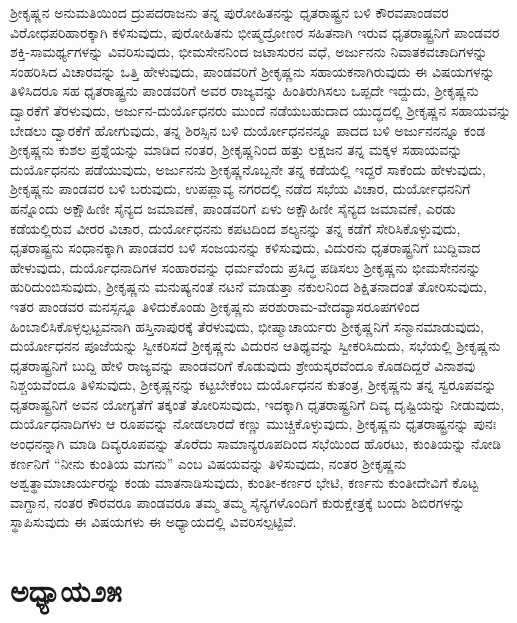 ಶ‍್ರೀಕೃಷ್ಣನ ಅನುಮತಿಯಿಂದ ದ್ರುಪದರಾಜನು ತನ್ನ ಪುರೋಹಿತನನ್ನು ಧೃತರಾಷ್ಟ್ರನ ಬಳಿ ಕೌರವಪಾಂಡವರ ವಿರೋಧಪರಿಹಾರಕ್ಕಾಗಿ ಕಳಿಸುವುದು, ಪುರೋಹಿತನು ಭೀಷ್ಮದ್ರೋಣರ ಸಹಿತನಾಗಿ ಇರುವ ಧೃತರಾಷ್ಟ್ರನಿಗೆ ಪಾಂಡವರ ಶಕ್ತಿ-ಸಾಮರ್ಥ್ಯಗಳನ್ನು ವಿವರಿಸುವುದು, ಭೀಮಸೇನನಿಂದ ಜಟಾಸುರನ ವಧೆ, ಅರ್ಜುನನು ನಿವಾತಕವಚಾದಿಗಳನ್ನು ಸಂಹರಿಸಿದ ವಿಚಾರವನ್ನು ಒತ್ತಿ ಹೇಳುವುದು, ಪಾಂಡವರಿಗೆ ಶ‍್ರೀಕೃಷ್ಣನು ಸಹಾಯಕನಾಗಿರುವುದು ಈ ವಿಷಯಗಳನ್ನು ತಿಳಿಸಿದರೂ ಸಹ ಧೃತರಾಷ್ಟ್ರನು ಪಾಂಡವರಿಗೆ ಅವರ ರಾಜ್ಯವನ್ನು ಹಿಂತಿರುಗಿಸಲು ಒಪ್ಪದೇ ಇದ್ದುದು, ಶ‍್ರೀಕೃಷ್ಣನು ದ್ವಾರಕೆಗೆ ತೆರಳುವುದು, ಅರ್ಜುನ-ದುರ್ಯೊಧನರು ಮುಂದೆ ನಡೆಯಬಹುದಾದ ಯುದ್ಧದಲ್ಲಿ ಶ‍್ರೀಕೃಷ್ಣನ ಸಹಾಯವನ್ನು ಬೇಡಲು ದ್ವಾರಕೆಗೆ ಹೋಗುವುದು, ತನ್ನ ಶಿರಸ್ಸಿನ ಬಳಿ ದುರ್ಯೋಧನನನ್ನೂ ಪಾದದ ಬಳಿ ಅರ್ಜುನನನ್ನೂ ಕಂಡ ಶ‍್ರೀಕೃಷ್ಣನು ಕುಶಲ ಪ್ರಶ್ನೆಯನ್ನು ಮಾಡಿದ ನಂತರ, ಶ‍್ರೀಕೃಷ್ಣನಿಂದ ಹತ್ತು ಲಕ್ಷಜನ ತನ್ನ ಮಕ್ಕಳ ಸಹಾಯವನ್ನು ದುರ್ಯೊಧನನು ಪಡೆಯುವುದು, ಅರ್ಜುನನು ಶ‍್ರೀಕೃಷ್ಣನೊಬ್ಬನೇ ತನ್ನ ಕಡೆಯಲ್ಲಿ ಇದ್ದರೆ ಸಾಕೆಂದು ಹೇಳುವುದು, ಶ‍್ರೀಕೃಷ್ಣನು ಪಾಂಡವರ ಬಳಿ ಬರುವುದು, ಉಪಪ್ಲಾವ್ಯ ನಗರದಲ್ಲಿ ನಡೆದ ಸಭೆಯ ವಿಚಾರ, ದುರ್ಯೋಧನನಿಗೆ ಹನ್ನೊಂದು ಅಕ್ಷೌಹಿಣೀ ಸೈನ್ಯದ ಜಮಾವಣೆ, ಪಾಂಡವರಿಗೆ ಏಳು ಅಕ್ಷೌಹಿಣೀ ಸೈನ್ಯದ ಜಮಾವಣೆ, ಎರಡು ಕಡೆಯಲ್ಲಿರುವ ವೀರರ ವಿಚಾರ, ದುರ್ಯೋಧನನು ಕಪಟದಿಂದ ಶಲ್ಯನನ್ನು ತನ್ನ ಕಡೆಗೆ ಸೇರಿಸಿಕೊಳ್ಳುವುದು, ಧೃತರಾಷ್ಟ್ರನು ಸಂಧಾನಕ್ಕಾಗಿ ಪಾಂಡವರ ಬಳಿ ಸಂಜಯನನ್ನು ಕಳಿಸುವುದು, ವಿದುರನು ಧೃತರಾಷ್ಟ್ರನಿಗೆ ಬುದ್ದಿವಾದ ಹೇಳುವುದು, ದುರ್ಯೊಧನಾದಿಗಳ ಸಂಹಾರವನ್ನು ಧರ್ಮವೆಂದು ಪ್ರಸಿದ್ಧ ಪಡಿಸಲು ಶ‍್ರೀಕೃಷ್ಣನು ಭೀಮಸೇನನನ್ನು ಹುರಿದುಂಬಿಸುವುದು, ಶ‍್ರೀಕೃಷ್ಣನು ಮನುಷ್ಯನಂತೆ ನಟನೆ ಮಾಡುತ್ತಾ ನಕುಲನಿಂದ ಶಿಕ್ಷಿತನಾದಂತೆ ತೋರಿಸುವುದು, ಇತರ ಪಾಂಡವರ ಮನಸ್ಸನ್ನೂ ತಿಳಿದುಕೊಂಡು ಶ‍್ರೀಕೃಷ್ಣನು ಪರಶುರಾಮ-ವೇದವ್ಯಾಸರೂಪಗಳಿಂದ ಹಿಂಬಾಲಿಸಿಕೊಳ್ಳಲ್ಪಟ್ಟವನಾಗಿ ಹಸ್ತಿನಾಪುರಕ್ಕೆ ತೆರಳುವುದು, ಭೀಷ್ಮಾಚಾರ್ಯರು ಶ‍್ರೀಕೃಷ್ಣನಿಗೆ ಸನ್ಮಾನಮಾಡುವುದು, ದುರ್ಯೋಧನನ ಪೂಜೆಯನ್ನು ಸ್ವೀಕರಿಸದೆ ಶ‍್ರೀಕೃಷ್ಣನು ವಿದುರನ ಆತಿಥ್ಯವನ್ನು ಸ್ವೀಕರಿಸಿದುದು, ಸಭೆಯಲ್ಲಿ ಶ‍್ರೀಕೃಷ್ಣನು ಧೃತರಾಷ್ಟ್ರನಿಗೆ ಬುದ್ದಿ ಹೇಳಿ ರಾಜ್ಯವನ್ನು ಪಾಂಡವರಿಗೆ ಕೊಡುವುದು ಶ್ರೇಯಸ್ಕರವೆಂದೂ ಕೊಡದಿದ್ದರೆ ವಿನಾಶವು ನಿಶ್ಚಯವೆಂದೂ ತಿಳಿಸುವುದು, ಶ‍್ರೀಕೃಷ್ಣನನ್ನು ಕಟ್ಟಬೇಕೆಂಬ ದುರ್ಯೊಧನನ ಕುತಂತ್ರ, ಶ‍್ರೀಕೃಷ್ಣನು ತನ್ನ ಸ್ವರೂಪವನ್ನು ಧೃತರಾಷ್ಟ್ರನಿಗೆ ಅವನ ಯೋಗ್ಯತೆಗೆ ತಕ್ಕಂತೆ ತೋರಿಸುವುದು, ಇದಕ್ಕಾಗಿ ಧೃತರಾಷ್ಟ್ರನಿಗೆ ದಿವ್ಯ ದೃಷ್ಟಿಯನ್ನು ನೀಡುವುದು, ದುರ್ಯೊಧನಾದಿಗಳು ಆ ರೂಪವನ್ನು ನೋಡಲಾರದೆ ಕಣ್ಣು ಮುಚ್ಚಿಕೊಳ್ಳುವುದು, ಶ‍್ರೀಕೃಷ್ಣನು ಧೃತರಾಷ್ಟ್ರನನ್ನು ಪುನಃ ಅಂಧನನ್ನಾಗಿ ಮಾಡಿ ದಿವ್ಯರೂಪವನ್ನು ತೊರೆದು ಸಾಮಾನ್ಯರೂಪದಿಂದ ಸಭೆಯಿಂದ ಹೊರಟು, ಕುಂತಿಯನ್ನು ನೋಡಿ ಕರ್ಣನಿಗೆ “ನೀನು ಕುಂತಿಯ ಮಗನು” ಎಂಬ ವಿಷಯವನ್ನು ತಿಳಿಸುವುದು, ನಂತರ ಶ‍್ರೀಕೃಷ್ಣನು ಅಶ್ವತ್ಥಾಮಾಚಾರ್ಯರನ್ನು ಕಂಡು ಮಾತನಾಡಿಸುವುದು, ಕುಂತೀ-ಕರ್ಣರ ಭೇಟಿ, ಕರ್ಣನು ಕುಂತೀದೇವಿಗೆ ಕೊಟ್ಟ ವಾಗ್ದಾನ, ನಂತರ ಕೌರವರೂ ಪಾಂಡವರೂ ತಮ್ಮ ತಮ್ಮ ಸೈನ್ಯಗಳೊಂದಿಗೆ ಕುರುಕ್ಷೇತ್ರಕ್ಕೆ ಬಂದು ಶಿಬಿರಗಳನ್ನು ಸ್ಥಾಪಿಸುವುದು ಈ ವಿಷಯಗಳು ಈ ಅಧ್ಯಾಯದಲ್ಲಿ ವಿವರಿಸಲ್ಪಟ್ಟಿವೆ.

\vspace{-.2cm}

\section*{ಅಧ್ಯಾಯ\enginline{-}೨೫}

